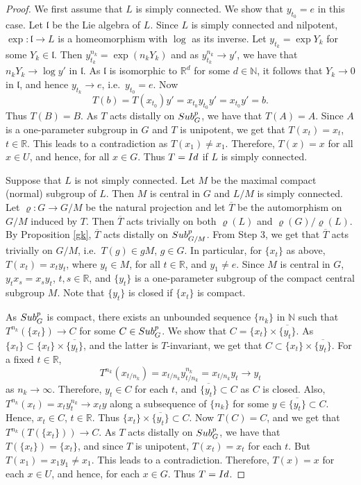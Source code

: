 \documentclass{amsart}
\numberwithin{equation}{section}
\newcommand{\N}{{\mathbb N}}
\newcommand{\R}{{\mathbb R}}
\newcommand{\lf}{{\mathfrak l}}
\newcommand{\spg}{{\rm Sub}^p_G}
\newcommand{\spp}{{\rm Sub}^{p}}
\newcommand{\Id}{{\rm Id}}
\let\ol=\overline
\theoremstyle{remark}
\begin{document}
\begin{proof}
 \smallskip
  We first assume that $L$ is simply connected. We show that $y_{t_0}=e$ in this case.
Let $\lf$ be the Lie algebra of $L$. Since $L$ is simply connected and nilpotent, $\exp: \lf\to L$ is a 
homeomorphism with $\log$ as its inverse. Let $y_{t_k}=\exp Y_k$ for some $Y_k\in\lf$. 
Then $y_{t_k}^{n_k}=\exp(n_kY_k)$ and as $y_{t_k}^{n_k}\to y'$, we have 
that $n_kY_k\to \log y'$ in $\lf$. As $\lf$ is isomorphic to $\R^d$ for some $d\in\N$, it follows that $Y_k\to 0$ in $\lf$, 
and hence $y_{t_k}\to e$, i.e.\ $y_{t_0}=e$. Now
$$
T(b)=T(x_{t_0})y'=x_{t_0}y_{t_0}y'=x_{t_0}y'=b.$$
Thus $T(B)=B$. As $T$ acts distally on $\spg$, we have that $T(A)=A$. Since $A$ is a one-parameter subgroup in $G$ 
and $T$ is unipotent, we get that $T(x_t)=x_t$, $t\in\R$. This leads to a contradiction as $T(x_1)\ne x_1$. 
Therefore, $T(x)=x$ for all $x\in U$, and hence, for all $x\in G$. Thus $T=\Id$ if $L$ is simply connected. 
 
 \smallskip
  Suppose that $L$ is not simply connected. Let $M$ be the maximal 
 compact (normal) subgroup of $L$. Then $M$ is central in $G$ and $L/M$ is simply connected. 
 Let $\varrho:G\to G/M$ be the natural projection and let $\ol{T}$ be the automorphism on $G/M$ 
 induced by $T$. Then $\ol{T}$ acts trivially on both $\varrho(L)$ and $\varrho(G)/\varrho(L)$. 
 By Proposition \ref{gk}, $\ol{T}$ acts distally on $\spp_{G/M}$. From Step 3, we get that $\ol{T}$ acts trivially on 
 $G/M$, i.e.\ $T(g)\in gM$, $g\in G$. In particular, for $\{x_t\}$ as above, $T(x_t)=x_ty_t$, where $y_t\in M$, 
 for all $t\in\R$, and $y_1\ne e$. Since $M$ is central in $G$, $y_tx_s=x_sy_t$, $t, s\in \R$, and $\{y_t\}$ is a 
 one-parameter subgroup of the compact central subgroup $M$. Note that $\{y_t\}$ is closed if $\{x_t\}$ is compact. 

As $\spg$ is compact, there exists an unbounded sequence $\{n_k\}$ in $\N$ such that $T^{n_k}(\{x_t\})\to C$ 
for some $C\in\spg$. We show that $C=\{x_t\}\times \ol{\{y_t\}}$. As $\{x_t\}\subset \{x_t\}\times \ol{\{y_t\}}$, 
and the latter is $T$-invariant, we get that $C\subset \{x_t\}\times \ol{\{y_t\}}$. For a fixed $t\in\R$, 
$$
T^{n_k}(x_{t/n_k})=x_{t/n_k}y_{t/n_k}^{n_k}=x_{t/n_k}y_t\to y_t$$ 
as $n_k\to\infty$. Therefore, $y_t\in C$ for each $t$, and $\ol{\{y_t\}}\subset C$ as $C$ is closed. Also, 
$T^{n_k}(x_t)=x_ty_t^{n_k}\to x_ty$ along a subsequence of $\{n_k\}$ for some $y\in\ol{\{y_t\}}\subset C$.
Hence, $x_t\in C$, $t\in\R$. Thus $\{x_t\}\times \ol{\{y_t\}}\subset C$. 
Now $T(C)=C$, and we get that $T^{n_k}(T(\{x_t\}))\to C$. As $T$ acts distally on $\spg$, we have that 
$T(\{x_t\})=\{x_t\}$, and since $T$ is unipotent, $T(x_t)=x_t$ for each $t$. 
But $T(x_1)=x_1y_1\ne x_1$.  
This leads to a contradiction. Therefore, $T(x)=x$ for each $x\in U$, and hence, for each $x\in G$. 
Thus $T=\Id$.
 \end{proof}
\end{document}
